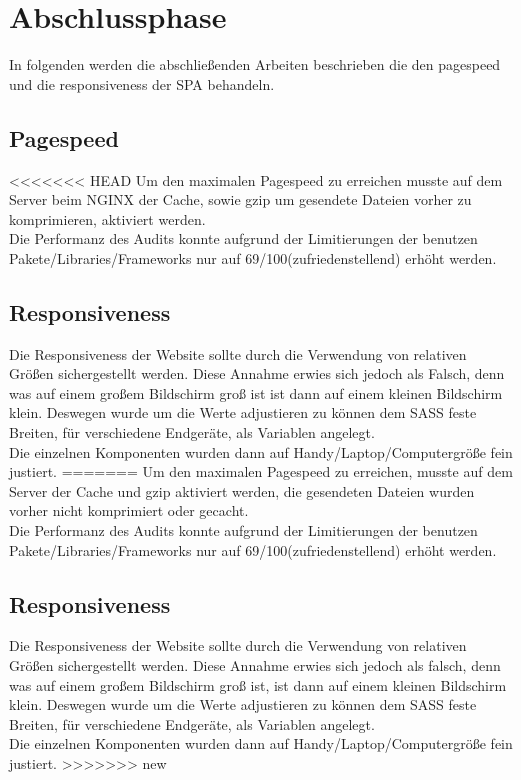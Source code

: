 \documentclass[11pt,a4paper]{article}
\begin{document}
\section{Abschlussphase}
In folgenden werden die abschließenden Arbeiten beschrieben die den pagespeed und die responsiveness der SPA behandeln.
\subsection{Pagespeed}
<<<<<<< HEAD
Um den maximalen Pagespeed zu erreichen musste auf dem Server beim NGINX der Cache, sowie gzip um gesendete Dateien vorher zu komprimieren, aktiviert werden.\\ Die Performanz des Audits konnte aufgrund der Limitierungen der benutzen Pakete/Libraries/Frameworks nur auf 69/100(zufriedenstellend) erhöht werden.
\subsection{Responsiveness}
Die Responsiveness der Website sollte durch die Verwendung von relativen Größen sichergestellt werden. Diese Annahme erwies sich jedoch als Falsch, denn was auf einem großem Bildschirm groß ist ist dann auf einem kleinen Bildschirm klein. Deswegen wurde um die Werte adjustieren zu können dem \acs{SASS} feste Breiten, für verschiedene Endgeräte, als Variablen angelegt.\\Die einzelnen Komponenten wurden dann auf Handy/Laptop/Computergröße fein justiert.
=======
Um den maximalen Pagespeed zu erreichen, musste auf dem Server der Cache und gzip aktiviert werden, die gesendeten Dateien wurden vorher nicht komprimiert oder gecacht.\\ Die Performanz des Audits konnte aufgrund der Limitierungen der benutzen Pakete/Libraries/Frameworks nur auf 69/100(zufriedenstellend) erhöht werden. 
\subsection{Responsiveness}
Die Responsiveness der Website sollte durch die Verwendung von relativen Größen sichergestellt werden. Diese Annahme erwies sich jedoch als falsch, denn was auf einem großem Bildschirm groß ist, ist dann auf einem kleinen Bildschirm klein. Deswegen wurde um die Werte adjustieren zu können dem \acs{SASS} feste Breiten, für verschiedene Endgeräte, als Variablen angelegt.\\Die einzelnen Komponenten wurden dann auf Handy/Laptop/Computergröße fein justiert.  
>>>>>>> new
\end{document}
